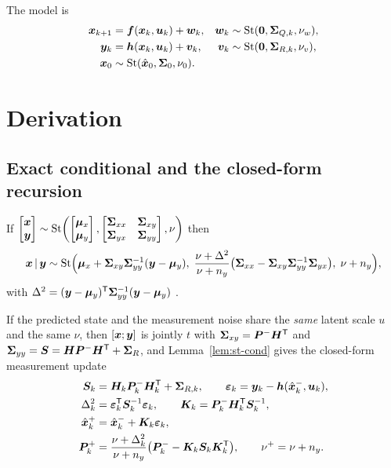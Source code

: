 The model is
\begin{align}
\bm{x}_{k+1}&=\bm{f}(\bm{x}_k,\bm{u}_k)+\bm{w}_k, & \bm{w}_k&\sim\mathrm{St}(\bm 0,\bm\Sigma_{Q,k},\nu_w),
  \label{eq:st-f}\\
\bm{y}_k&=\bm{h}(\bm{x}_k,\bm{u}_k)+\bm{v}_k, & \bm{v}_k&\sim\mathrm{St}(\bm 0,\bm\Sigma_{R,k},\nu_v),
  \label{eq:st-h}\\
\bm{x}_0&\sim\mathrm{St}(\hat{\bm{x}}_0,\bm\Sigma_0,\nu_0). & &
  \label{eq:st-x0}
\end{align}

\section{Derivation}

\subsection{Exact conditional and the closed-form recursion}\label{sec:st-exact}
\begin{lemma}\label{lem:st-cond}
If $\begin{bmatrix}\bm{x}\\\bm{y}\end{bmatrix}\sim
\mathrm{St}\!\left(\begin{bmatrix}\bm\mu_x\\\bm\mu_y\end{bmatrix},
\begin{bmatrix}\bm\Sigma_{xx}&\bm\Sigma_{xy}\\\bm\Sigma_{yx}&\bm\Sigma_{yy}\end{bmatrix},\nu\right)$
then
\begin{equation}
\bm{x}\,|\,\bm{y} \sim \mathrm{St}\Big(
\bm\mu_x+\bm\Sigma_{xy}\bm\Sigma_{yy}^{-1}(\bm{y}-\bm\mu_y),\;
\frac{\nu+\Delta^2}{\nu+n_y}\big(\bm\Sigma_{xx}-\bm\Sigma_{xy}\bm\Sigma_{yy}^{-1}\bm\Sigma_{yx}\big),
\;\nu+n_y\Big),
\label{eq:st-cond}
\end{equation}
with $\Delta^2=(\bm{y}-\bm\mu_y)^{\mathsf{T}}\bm\Sigma_{yy}^{-1}(\bm{y}-\bm\mu_y)$
\cite[Ch.~1]{kotz2004multivariatet}.
\end{lemma}

If the predicted state and the measurement noise share the \emph{same} latent scale $u$ and the
same $\nu$, then $[\bm{x};\bm{y}]$ is jointly $t$ with
$\bm\Sigma_{xy}=\bm{P}^{-}\bm{H}^{\mathsf{T}}$ and $\bm\Sigma_{yy}=\bm{S}=\bm{H}\bm{P}^{-}\bm{H}^{\mathsf{T}}+\bm\Sigma_R$, and
Lemma~\ref{lem:st-cond} gives the closed-form measurement update
\begin{align}
\bm{S}_k&=\bm{H}_k\bm{P}^{-}_k\bm{H}_k^{\mathsf{T}}+\bm\Sigma_{R,k}, \qquad
\bm{\varepsilon}_k=\bm{y}_k-\bm{h}(\hat{\bm{x}}^{-}_k,\bm{u}_k), \label{eq:st-S}\\
\Delta_k^2&=\bm{\varepsilon}_k^{\mathsf{T}}\bm{S}_k^{-1}\bm{\varepsilon}_k, \qquad
\bm{K}_k=\bm{P}^{-}_k\bm{H}_k^{\mathsf{T}}\bm{S}_k^{-1}, \label{eq:st-D}\\
\hat{\bm{x}}^{+}_k&=\hat{\bm{x}}^{-}_k+\bm{K}_k\bm{\varepsilon}_k, \label{eq:st-x}\\
\bm{P}^{+}_k&=\frac{\nu+\Delta_k^2}{\nu+n_y}\big(\bm{P}^{-}_k-\bm{K}_k\bm{S}_k\bm{K}_k^{\mathsf{T}}\big),\qquad
\nu^+=\nu+n_y. \label{eq:st-P}
\end{align}

